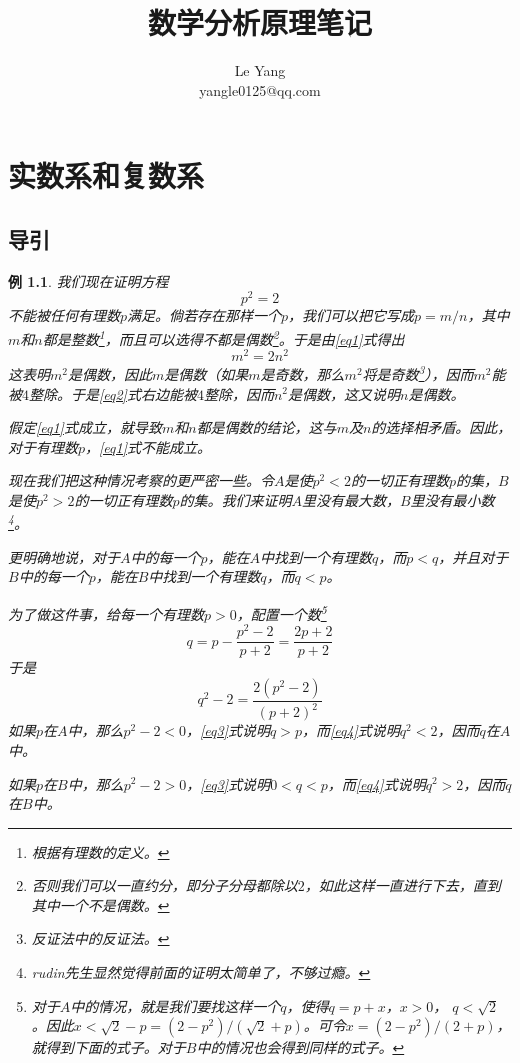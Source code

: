 \documentclass[a4paper,UTF8]{ctexbook}
\newtheorem{example}{例}[chapter]
\begin{document}
\title{数学分析原理笔记}
\author{
Le Yang\\
yangle0125@qq.com
}
\date{}
\maketitle

\tableofcontents

\chapter{实数系和复数系}

\section{导引}

\begin{example}
\label{example1}
我们现在证明方程
\begin{equation}
p^2 = 2	\label{eq1}
\end{equation}
不能被任何有理数$p$满足。倘若存在那样一个$p$，我们可以把它写成$p = m / n$，其中$m$和$n$都是整数\footnote{根据有理数的定义。}，而且可以选得不都是偶数\footnote{否则我们可以一直约分，即分子分母都除以$2$，如此这样一直进行下去，直到其中一个不是偶数。}。于是由\eqref{eq1}式得出
\begin{equation}
m^2 = 2n^2 \label{eq2}
\end{equation}
这表明$m^2$是偶数，因此$m$是偶数（如果$m$是奇数，那么$m^2$将是奇数\footnote{反证法中的反证法。}），因而$m^2$能被$4$整除。于是\eqref{eq2}式右边能被$4$整除，因而$n^2$是偶数，这又说明$n$是偶数。

假定\eqref{eq1}式成立，就导致$m$和$n$都是偶数的结论，这与$m$及$n$的选择相矛盾。因此，对于有理数$p$，\eqref{eq1}式不能成立。

现在我们把这种情况考察的更严密一些。令$A$是使$p^2 < 2$的一切正有理数$p$的集，$B$是使$p^2 > 2$的一切正有理数$p$的集。我们来证明$A$里没有最大数，$B$里没有最小数\footnote{rudin先生显然觉得前面的证明太简单了，不够过瘾。}。

更明确地说，对于$A$中的每一个$p$，能在$A$中找到一个有理数$q$，而$p < q$，并且对于$B$中的每一个$p$，能在$B$中找到一个有理数$q$，而$q < p$。

为了做这件事，给每一个有理数$p > 0$，配置一个数\footnote{对于$A$中的情况，就是我们要找这样一个$q$，使得$q = p + x$，$x > 0$， $q < \sqrt{2}$。因此$x < \sqrt{2} - p = (2 - p^2) / (\sqrt{2} + p)$。可令$x = (2 - p^2) / (2 + p)$，就得到下面的式子。对于$B$中的情况也会得到同样的式子。}
\begin{equation}
q = p - \frac{p^2 - 2}{p + 2} = \frac{2p + 2}{p + 2} \label{eq3}
\end{equation}
于是
\begin{equation}
q^2 - 2 = \frac{2(p^2 - 2)}{(p + 2)^2} \label{eq4}
\end{equation}
如果$p$在$A$中，那么$p^2 - 2 < 0$，\eqref{eq3}式说明$q > p$，而\eqref{eq4}式说明$q^2 < 2$，因而$q$在$A$中。

如果$p$在$B$中，那么$p^2 - 2 > 0$，\eqref{eq3}式说明$0 < q < p$，而\eqref{eq4}式说明$q^2 > 2$，因而$q$在$B$中。
\end{example}
\end{document}
